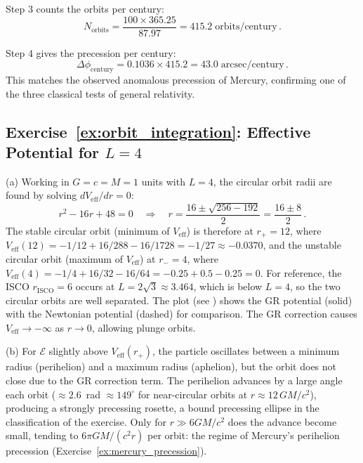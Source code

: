 Step 3 counts the orbits per century:
\begin{equation*}
    N_{\mathrm{orbits}} = \frac{100 \times 365.25}{87.97} = 415.2 \;\text{orbits/century} \,.
\end{equation*}

Step 4 gives the precession per century:
\begin{equation*}
    \Delta\phi_{\mathrm{century}}
    = 0.1036 \times 415.2
    = \boxed{43.0 \;\text{arcsec/century}} \,.
\end{equation*}
This matches the observed anomalous precession of Mercury, confirming one
of the three classical tests of general relativity.

\subsection*{Exercise~\ref{ex:orbit_integration}: Effective Potential for $L = 4$}

(a) Working in $G = c = M = 1$ units with $L = 4$, the circular
orbit radii are found by solving $dV_{\mathrm{eff}}/dr = 0$:
\begin{equation*}
    r^2 - 16r + 48 = 0
    \quad\Longrightarrow\quad
    r = \frac{16 \pm \sqrt{256 - 192}}{2}
    = \frac{16 \pm 8}{2} \,.
\end{equation*}
The stable circular orbit (minimum of $V_{\mathrm{eff}}$) is therefore at
$r_+ = 12$, where $V_{\mathrm{eff}}(12) = -1/12 + 16/288 - 16/1728 = -1/27 \approx -0.0370$,
and the unstable circular orbit (maximum of $V_{\mathrm{eff}}$) at
$r_- = 4$, where $V_{\mathrm{eff}}(4) = -1/4 + 16/32 - 16/64 = -0.25 + 0.5 - 0.25 = 0$.
For reference, the ISCO $r_{\mathrm{ISCO}} = 6$ occurs at
$L = 2\sqrt{3} \approx 3.464$, which is below $L = 4$, so the two
circular orbits are well separated.
The plot (see )
shows the GR potential (solid) with the Newtonian potential (dashed) for
comparison.  The GR correction causes $V_{\mathrm{eff}} \to -\infty$ as
$r \to 0$, allowing plunge orbits.

(b) For $\mathcal{E}$ slightly above $V_{\mathrm{eff}}(r_+)$, the
particle oscillates between a minimum radius (perihelion) and a maximum
radius (aphelion), but the orbit does not close due to the GR correction
term.  The perihelion advances by a large angle each orbit
($\approx 2.6$~rad $\approx 149^\circ$ for near-circular orbits at
$r \approx 12\,GM/c^2$), producing a strongly precessing rosette, a
bound precessing ellipse in the classification of the exercise.
Only for $r \gg 6GM/c^2$ does the advance become small, tending to
$6\pi GM/(c^2 r)$ per orbit: the regime of Mercury's perihelion precession
(Exercise~\ref{ex:mercury_precession}).

